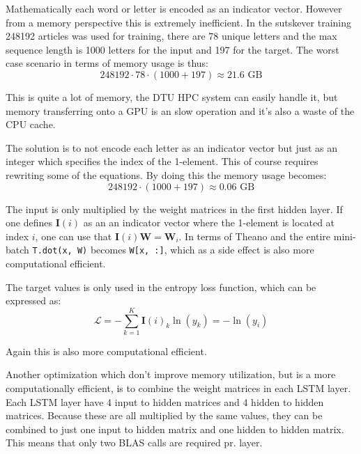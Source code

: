 Mathematically each word or letter is encoded as an indicator vector. However from a memory perspective this is extremely inefficient. In the sutskever training 248192 articles was used for training, there are 78 unique letters and the max sequence length is 1000 letters for the input and 197 for the target. The worst case scenario in terms of memory usage is thus:
\begin{equation}
248192 \cdot 78 \cdot (1000 + 197) \approx 21.6 \text{ GB}
\end{equation}

This is quite a lot of memory, the DTU HPC system can easily handle it, but memory transferring onto a GPU is an slow operation and it's also a waste of the CPU cache.

The solution is to not encode each letter as an indicator vector but just as an integer which specifies the index of the 1-element. This of course requires rewriting some of the equations. By doing this the memory usage becomes:
\begin{equation}
248192 \cdot (1000 + 197) \approx 0.06 \text{ GB}
\end{equation}

The input is only multiplied by the weight matrices in the first hidden layer. If one defines $\mathbf{I}(i)$ as an an indicator vector where the 1-element is located at index $i$, one can use that $\mathbf{I}(i) \mathbf{W} = \mathbf{W}_{i}$. In terms of Theano and the entire mini-batch \texttt{T.dot(x, W)} becomes \texttt{W[x, :]}, which as a side effect is also more computational efficient.

The target values is only used in the entropy loss function, which can be expressed as:
\begin{equation}
\mathcal{L} = - \sum_{k=1}^K \mathbf{I}(i)_k \ln(y_k) = - \ln(y_i)
\end{equation}

Again this is also more computational efficient.

Another optimization which don't improve memory utilization, but is a more computationally efficient, is to combine the weight matrices in each LSTM layer. Each LSTM layer have 4 input to hidden matrices and 4 hidden to hidden matrices. Because these are all multiplied by the same values, they can be combined to just one input to hidden matrix and one hidden to hidden matrix. This means that only two BLAS calls are required pr. layer.

